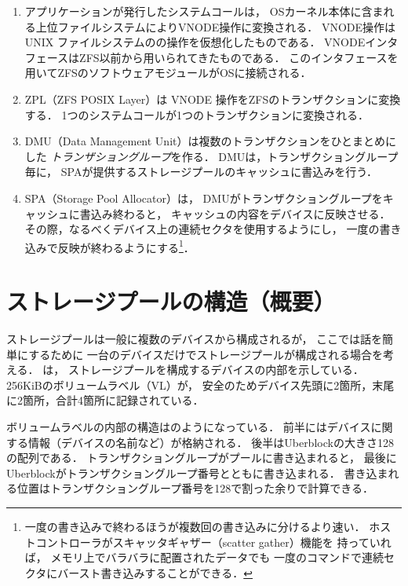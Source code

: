 \begin{enumerate}
\item アプリケーションが発行したシステムコールは，
  OSカーネル本体に含まれる上位ファイルシステムによりVNODE操作に変換される．
  VNODE操作は UNIX ファイルシステムの\inode の操作を仮想化したものである．
  VNODEインタフェースはZFS以前から用いられてきたものである．
  このインタフェースを用いてZFSのソフトウェアモジュールがOSに接続される．

\item ZPL（ZFS POSIX Layer）は VNODE 操作をZFSのトランザクションに変換する．
  1つのシステムコールが1つのトランザクションに変換される．

\item DMU（Data Management Unit）は複数のトランザクションをひとまとめにした
  \emph{トランザショングループ}を作る．
  DMUは，トランザクショングループ毎に，
  SPAが提供するストレージプールのキャッシュに書込みを行う．

\item SPA（Storage Pool Allocator）は，
  DMUがトランザクショングループをキャッシュに書込み終わると，
  キャッシュの内容をデバイスに反映させる．
  その際，なるべくデバイス上の連続セクタを使用するようにし，
  一度の書き込みで反映が終わるようにする\footnote{
    一度の書き込みで終わるほうが複数回の書き込みに分けるより速い．
    ホストコントローラがスキャッタギャザー（scatter gather）機能を
    持っていれば，
    メモリ上でバラバラに配置されたデータでも
    一度のコマンドで連続セクタにバースト書き込みすることができる．
  }．
\end{enumerate}

\section{ストレージプールの構造（概要）}
ストレージプールは一般に複数のデバイスから構成されるが，
ここでは話を簡単にするために
一台のデバイスだけでストレージプールが構成される場合を考える．
は，
ストレージプールを構成するデバイスの内部を示している．
256KiBのボリュームラベル（VL）が，
安全のためデバイス先頭に2箇所，末尾に2箇所，合計4箇所に記録されている．

ボリュームラベルの内部の構造はのようになっている．
前半にはデバイスに関する情報（デバイスの名前など）が格納される．
後半はUberblockの大きさ128の配列である．
トランザクショングループがプールに書き込まれると，
最後にUberblockがトランザクショングループ番号とともに書き込まれる．
書き込まれる位置はトランザクショングループ番号を128で割った余りで計算できる．

